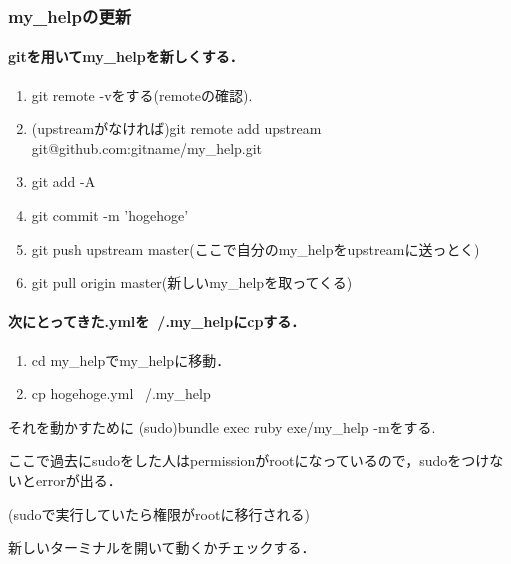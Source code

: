 \subsubsection{my\_helpの更新}
\paragraph{gitを用いてmy\_helpを新しくする．}
\begin{enumerate}
\item git remote -vをする(remoteの確認).
\item (upstreamがなければ)git remote add upstream git@github.com:gitname/my\_help.git
\item git add -A
\item git commit -m 'hogehoge'
\item git push upstream master(ここで自分のmy\_helpをupstreamに送っとく)
\item git pull origin master(新しいmy\_helpを取ってくる)
\end{enumerate}
\paragraph{次にとってきた.ymlを~/.my\_helpにcpする．}
\begin{enumerate}
\item cd my\_helpでmy\_helpに移動．
\item cp hogehoge.yml ~/.my\_help
\end{enumerate}
それを動かすために
(sudo)bundle exec ruby exe/my\_help -mをする.

ここで過去にsudoをした人はpermissionがrootになっているので，sudoをつけないとerrorが出る．

(sudoで実行していたら権限がrootに移行される)

新しいターミナルを開いて動くかチェックする．

